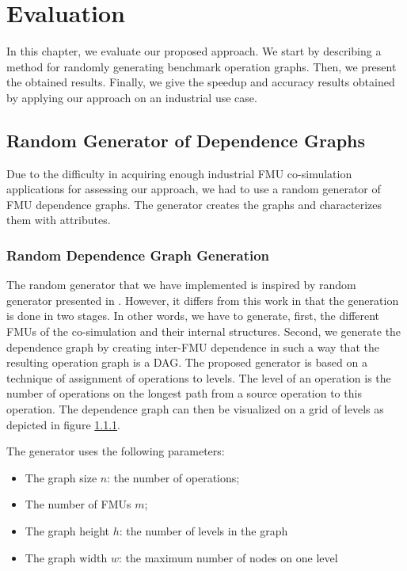 \chapter{\label{ch:6-eval}Evaluation}

\minitoc

In this chapter, we evaluate our proposed approach. We start by describing a method for randomly generating benchmark operation graphs. Then, we present the obtained results. Finally, we give the speedup and accuracy results obtained by applying our approach on an industrial use case.

\section{Random Generator of Dependence Graphs}

Due to the difficulty in acquiring enough industrial FMU co-simulation applications for assessing our approach, we had to use a random generator of FMU dependence graphs. The generator creates the graphs and characterizes them with attributes.

\subsection{Random Dependence Graph Generation}

The random generator that we have implemented is inspired by random generator presented in \cite{kalla:2004}. However, it differs from this work in that the generation is done in two stages. In other words, we have to generate, first, the different FMUs of the co-simulation and their internal structures. Second, we generate the dependence graph by creating inter-FMU dependence in such a way that the resulting operation graph is a DAG. The proposed generator is based on a technique of assignment of operations to levels. The level of an operation is the number of operations on the longest path from a source operation to this operation. The dependence graph can then be visualized on a grid of levels as depicted in figure \ref{}. 


The generator uses the following parameters:

\begin{itemize}
\item The graph size $n$: the number of operations;
\item The number of FMUs $m$;
\item The graph height $h$: the number of levels in the graph
\item The graph width $w$: the maximum number of nodes on one level
\end{itemize}


